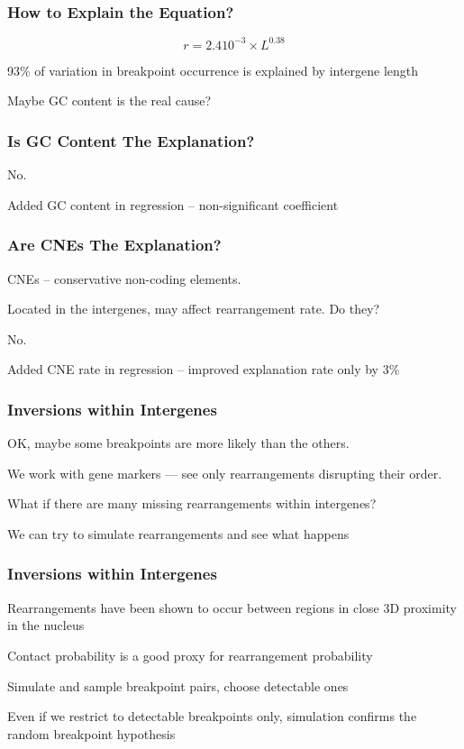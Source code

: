 \documentclass[svgnames,14pt]{beamer}
\begin{document}
\begin{frame}
\frametitle{How to Explain the Equation?}
$$r = 2.4 10^{-3} \times L ^ {0.38}$$

93\% of variation in breakpoint occurrence is explained by intergene length

\vspace{12pt}
Maybe GC content is the real cause?
\end{frame}

\begin{frame}
\frametitle{Is GC Content The Explanation?}
No.
\vspace{12pt}

\pause
Added GC content in regression -- non-significant coefficient
\end{frame}

\begin{frame}
\frametitle{Are CNEs The Explanation?}
CNEs -- conservative non-coding elements.

Located in the intergenes, may affect rearrangement rate.
Do they?
\vspace{12pt}

\pause
No.
\vspace{12pt}

\pause
Added CNE rate in regression -- improved explanation rate only by 3\%
\end{frame}

\begin{frame}
\frametitle{Inversions within Intergenes}
OK, maybe some breakpoints are more likely than the others.

\vspace{12pt}
We work with gene markers --- see only rearrangements disrupting their order.

\vspace{12pt}
What if there are many missing rearrangements within intergenes?

\vspace{12pt}
We can try to simulate rearrangements and see what happens
\end{frame}

\begin{frame}
\frametitle{Inversions within Intergenes}
Rearrangements have been shown to occur between regions in close 3D proximity in the nucleus

\vspace{12pt}
Contact probability is a good proxy for rearrangement probability

\vspace{12pt}
Simulate and sample breakpoint pairs, choose detectable ones

\vspace{12pt}
Even if we restrict to detectable breakpoints only, simulation confirms the random breakpoint hypothesis
\end{frame}
\end{document}
